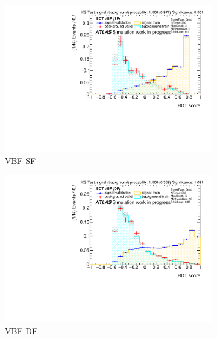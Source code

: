 \begin{figure}[htbp]
    \centering
    \begin{subfigure}[t]{0.49\textwidth}
        \includegraphics[width=\textwidth]{./plots/mva/variable_reduction/VBF_SF_bdt_output_clean.pdf}
        \caption{VBF SF}
    \end{subfigure}
    \begin{subfigure}[t]{0.49\textwidth}
        \includegraphics[width=\textwidth]{./plots/mva/variable_reduction/VBF_DF_bdt_output_clean.pdf}
        \caption{VBF DF}
    \end{subfigure}
    \begin{subfigure}[t]{0.49\textwidth}

\end{subfigure}
\end{figure}
